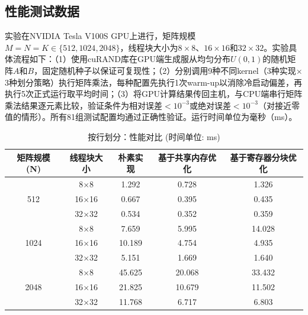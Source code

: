 \documentclass{SYSUReport}
\begin{document}
\subsection{性能测试数据}

实验在NVIDIA Tesla V100S GPU上进行，矩阵规模$M=N=K \in \{512, 1024, 2048\}$，线程块大小为$8\times 8$、$16\times 16$和$32\times 32$。实验具体流程如下：（1）使用cuRAND库在GPU端生成服从均匀分布$U(0,1)$的随机矩阵$A$和$B$，固定随机种子以保证可复现性；（2）分别调用9种不同kernel（3种实现$\times$3种划分策略）执行矩阵乘法，每种配置先执行1次warm-up以消除冷启动偏差，再执行5次正式运行取平均时间；（3）将GPU计算结果传回主机，与CPU端串行矩阵乘法结果逐元素比较，验证条件为相对误差$< 10^{-3}$或绝对误差$< 10^{-3}$（对接近零值的情形）。所有81组测试配置均通过正确性验证。运行时间单位为毫秒（ms）。

\begin{table}[H]
\centering
\caption{按行划分：性能对比 (时间单位: ms)}
\label{tab:perf_row}
\begin{tabular}{|c|c|c|c|c|}
\hline
矩阵规模 (N) & 线程块大小 & 朴素实现 & 基于共享内存优化 & 基于寄存器分块优化 \\
\hline
\multirow{3}{*}{512} & 8$\times$8 & 1.292 & 0.728 & 1.326 \\
\cline{2-5}
& 16$\times$16 & 0.667 & 0.395 & 0.435 \\
\cline{2-5}
& 32$\times$32 & 0.534 & 0.352 & 0.359 \\
\hline
\multirow{3}{*}{1024} & 8$\times$8 & 7.659 & 5.995 & 14.028 \\
\cline{2-5}
& 16$\times$16 & 10.189 & 4.754 & 4.935 \\
\cline{2-5}
& 32$\times$32 & 5.151 & 1.669 & 1.640 \\
\hline
\multirow{3}{*}{2048} & 8$\times$8 & 45.625 & 20.068 & 33.432 \\
\cline{2-5}
& 16$\times$16 & 21.825 & 10.679 & 11.502 \\
\cline{2-5}
& 32$\times$32 & 11.768 & 6.717 & 6.803 \\
\hline
\end{tabular}
\end{table}
\end{document}
